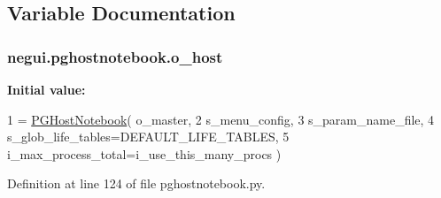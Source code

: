 \subsection{Variable Documentation}
\subsubsection[{\texorpdfstring{o\+\_\+host}{o_host}}]{\setlength{\rightskip}{0pt plus 5cm}negui.\+pghostnotebook.\+o\+\_\+host}\hypertarget{namespacenegui_1_1pghostnotebook_a90452a51dfebcdcd89ed5eccb9094fe7}{}\label{namespacenegui_1_1pghostnotebook_a90452a51dfebcdcd89ed5eccb9094fe7}
{\bfseries Initial value\+:}
\begin{DoxyCode}
1 = \hyperlink{classnegui_1_1pghostnotebook_1_1PGHostNotebook}{PGHostNotebook}( o\_master, 
2             s\_menu\_config, 
3             s\_param\_name\_file, 
4             s\_glob\_life\_tables=DEFAULT\_LIFE\_TABLES,
5             i\_max\_process\_total=i\_use\_this\_many\_procs )
\end{DoxyCode}


Definition at line 124 of file pghostnotebook.\+py.


